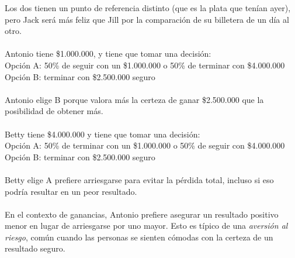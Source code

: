 \documentclass{article}
\begin{document}
            Los dos tienen un punto de referencia distinto (que es la plata que tenían ayer), pero Jack será más feliz que Jill por la comparación de su billetera de un día al otro. \\
            \\
            Antonio tiene \$1.000.000, y tiene que tomar una decisión: \\
            Opción A: 50\% de seguir con un \$1.000.000 o 50\% de terminar con \$4.000.000 \\
            Opción B: terminar con \$2.500.000 seguro \\
            \\
            Antonio elige B porque valora más la certeza de ganar \$2.500.000 que la posibilidad de obtener más. \\
            \\
            Betty tiene \$4.000.000 y tiene que tomar una decisión: \\
            Opción A: 50\% de terminar con un \$1.000.000 o 50\% de seguir con \$4.000.000 \\
            Opción B: terminar con \$2.500.000 seguro \\
            \\
            Betty elige A prefiere arriesgarse para evitar la pérdida total, incluso si eso podría resultar en un peor resultado. \\
            \\
            En el contexto de ganancias, Antonio prefiere asegurar un resultado positivo menor en lugar de arriesgarse por uno mayor. Esto es típico de una \emph{aversión al riesgo}, común cuando las personas se sienten cómodas con la certeza de un resultado seguro.
\end{document}
